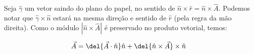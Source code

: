 \documentclass[]{IMTexam}
\begin{document}
\begin{questions}
\begin{solution}
\begin{multi}
		\end{multi}

		Seja $\hat{\gamma}$ um vetor saindo do plano do papel, no sentido de $ \hat{n}\times\hat{r}=\hat{n}\times\hat{A} $.
		Podemos notar que $ \hat{\gamma}\times\hat{n} $ estará na mesma direção e sentido de $\hat{r}$ (pela regra da mão direita). Como o módulo $ |\hat{n}\times\hat{A}| $ é preservado no produto vetorial, temos:

		\[ \vec{A}=\del{\vec{A}\cdot\hat{n}}\hat{n}+\del{\hat{n}\times\vec{A}}\times\hat{n} \]

	\end{solution}

\end{questions}
\end{document}

